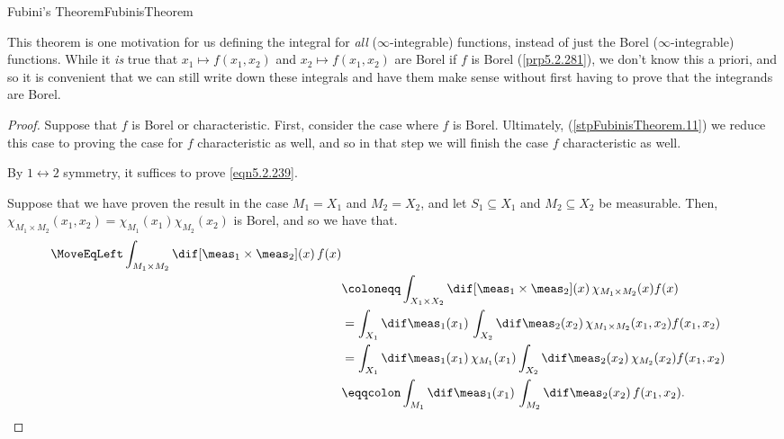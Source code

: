 \begin{thm}{Fubini's Theorem}{FubinisTheorem}
\begin{rmk}
\end{rmk}
\begin{rmk}
This theorem is one motivation for us defining the integral for \emph{all} ($\infty$-integrable) functions, instead of just the Borel ($\infty$-integrable) functions.  While it \emph{is} true that $x_1\mapsto f(x_1,x_2)$ and $x_2\mapsto f(x_1,x_2)$ are Borel if $f$ is Borel (\cref{prp5.2.281}), we don't know this a priori, and so it is convenient that we can still write down these integrals and have them make sense without first having to prove that the integrands are Borel.
\end{rmk}
\begin{proof}
Suppose that $f$ is Borel or characteristic.  First, consider the case where $f$ is Borel.  Ultimately, (\cref{stpFubinisTheorem.11}) we reduce this case to proving the case for $f$ characteristic as well, and so in that step we will finish the case $f$ characteristic as well.

By $1\leftrightarrow 2$ symmetry, it suffices to prove \eqref{eqn5.2.239}.

Suppose that we have proven the result in the case $M_1=X_1$ and $M_2=X_2$, and let $S_1\subseteq X_1$ and $M_2\subseteq X_2$ be measurable.  Then, $\chi _{M_1\times M_2}(x_1,x_2)=\chi _{M_1}(x_1)\chi _{M_2}(x_2)$ is Borel, and so we have that.
\begin{equation}
\begin{split}
\MoveEqLeft
\int _{M_1\times M_2}\dif [\meas _1\times \meas _2](x)\, f(x) \\
& \coloneqq \int _{X_1\times X_2}\dif [\meas _1\times \meas _2](x)\, \chi _{M_1\times M_2}(x)f(x) \\
& =\int _{X_1}\dif \meas _1(x_1)\, \int _{X_2}\dif \meas _2(x_2)\, \chi _{M_1\times M_2}(x_1,x_2)f(x_1,x_2) \\
& =\int _{X_1}\dif \meas _1(x_1)\, \chi _{M_1}(x_1)\int _{X_2}\dif \meas _2(x_2)\, \chi _{M_2}(x_2)f(x_1,x_2) \\
& \eqqcolon \int _{M_1}\dif \meas _1(x_1)\, \int _{M_2}\dif \meas _2(x_2)\, f(x_1,x_2).
\end{split}
\end{equation}


\end{proof}
\end{thm}
